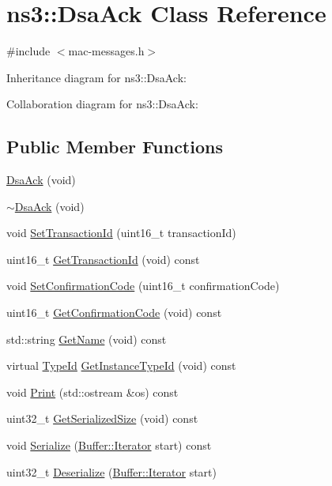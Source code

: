 \hypertarget{classns3_1_1DsaAck}{}\section{ns3\+:\+:Dsa\+Ack Class Reference}
\label{classns3_1_1DsaAck}


{\ttfamily \#include $<$mac-\/messages.\+h$>$}



Inheritance diagram for ns3\+:\+:Dsa\+Ack\+:


Collaboration diagram for ns3\+:\+:Dsa\+Ack\+:
\subsection*{Public Member Functions}
\begin{DoxyCompactItemize}
\item 
\hyperlink{classns3_1_1DsaAck_a2983e7b8d673a4859076b32d7b911321}{Dsa\+Ack} (void)
\item 
\hyperlink{classns3_1_1DsaAck_a5f386e2ea55dacd1dab2350792a9febc}{$\sim$\+Dsa\+Ack} (void)
\item 
void \hyperlink{classns3_1_1DsaAck_a490347015638b59c91b09db257d48323}{Set\+Transaction\+Id} (uint16\+\_\+t transaction\+Id)
\item 
uint16\+\_\+t \hyperlink{classns3_1_1DsaAck_a238546242b40d060cdee55ba294a41e8}{Get\+Transaction\+Id} (void) const 
\item 
void \hyperlink{classns3_1_1DsaAck_a27afab9fd68c4937de683c5a91b6f392}{Set\+Confirmation\+Code} (uint16\+\_\+t confirmation\+Code)
\item 
uint16\+\_\+t \hyperlink{classns3_1_1DsaAck_a1588100134c9c5bd7536dfa71d133cb7}{Get\+Confirmation\+Code} (void) const 
\item 
std\+::string \hyperlink{classns3_1_1DsaAck_ad851e82099b0fdc8b0b07708139bdf70}{Get\+Name} (void) const 
\item 
virtual \hyperlink{classns3_1_1TypeId}{Type\+Id} \hyperlink{classns3_1_1DsaAck_ac513dce97d4dc708abc64b6f4b6fc0a7}{Get\+Instance\+Type\+Id} (void) const 
\item 
void \hyperlink{classns3_1_1DsaAck_a0a406591d3d4dc96aabda400b65ed738}{Print} (std\+::ostream \&os) const 
\item 
uint32\+\_\+t \hyperlink{classns3_1_1DsaAck_a98c3c146f8ef5c59162047b52a2fd3dc}{Get\+Serialized\+Size} (void) const 
\item 
void \hyperlink{classns3_1_1DsaAck_a63cedd42efa1a87a5728465366b16e7c}{Serialize} (\hyperlink{classns3_1_1Buffer_1_1Iterator}{Buffer\+::\+Iterator} start) const 
\item 
uint32\+\_\+t \hyperlink{classns3_1_1DsaAck_aa5bad2a8f08d8428ecc7417ff9369eea}{Deserialize} (\hyperlink{classns3_1_1Buffer_1_1Iterator}{Buffer\+::\+Iterator} start)
\end{DoxyCompactItemize}
